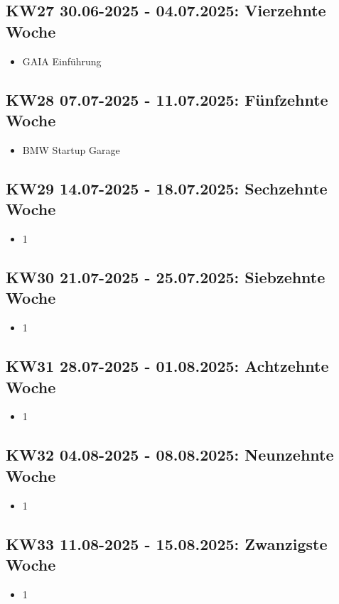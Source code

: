 \subsection{KW27 30.06-2025 - 04.07.2025: Vierzehnte Woche}
\begin{itemize}
  \item GAIA Einführung
\end{itemize}


\subsection{KW28 07.07-2025 - 11.07.2025: Fünfzehnte Woche}
\begin{itemize}
  \item BMW Startup Garage
\end{itemize}


\subsection{KW29 14.07-2025 - 18.07.2025: Sechzehnte Woche}
\begin{itemize}
  \item 1
\end{itemize}


\subsection{KW30 21.07-2025 - 25.07.2025: Siebzehnte Woche}
\begin{itemize}
  \item 1
\end{itemize}


\subsection{KW31 28.07-2025 - 01.08.2025: Achtzehnte Woche}
\begin{itemize}
  \item 1
\end{itemize}


\subsection{KW32 04.08-2025 - 08.08.2025: Neunzehnte Woche}
\begin{itemize}
  \item 1
\end{itemize}


\subsection{KW33 11.08-2025 - 15.08.2025: Zwanzigste Woche}
\begin{itemize}
  \item 1
\end{itemize}


